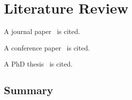 \chapter{Literature Review}
\label{ch:review}
\vspace{2em}

\lipsum

A journal paper~\cite{cacm70:Codd} is cited. 
\lipsum[2]

A conference paper~\cite{sigmod14:Chandramouli} is cited. 
\lipsum[3]

A PhD thesis~\cite{PHD:Pavlo} is cited.

\section{Summary}

\lipsum[10]
